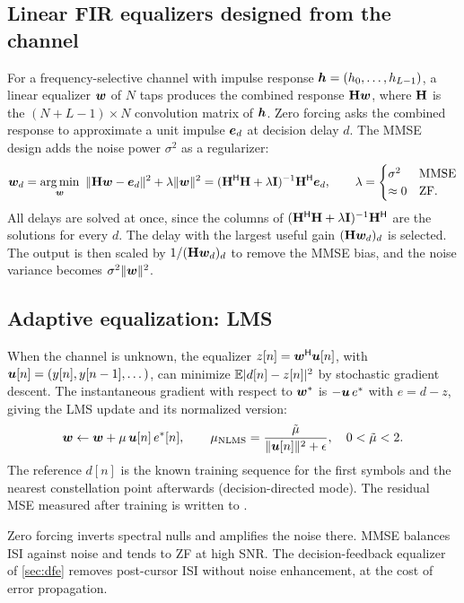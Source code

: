 \subsection{Linear FIR equalizers designed from the channel}
For a frequency-selective channel with impulse response $\bm{h}=(h_0,\dots,h_{L-1})$, a
linear equalizer $\bm{w}$ of $N$ taps produces the combined response $\mathbf{H}\bm{w}$, where
$\mathbf{H}$ is the $(N+L-1)\times N$ convolution matrix of $\bm{h}$. Zero forcing asks the combined
response to approximate a unit impulse $\bm{e}_d$ at decision delay $d$. The MMSE design adds
the noise power $\sigma^2$ as a regularizer:
\begin{equation}
  \bm{w}_d=\operatorname*{arg\,min}_{\bm{w}}\ \|\mathbf{H}\bm{w}-\bm{e}_d\|^2+\lambda\|\bm{w}\|^2
  =(\mathbf{H}^{\mathsf{H}}\mathbf{H}+\lambda\mathbf{I})^{-1}\mathbf{H}^{\mathsf{H}}\bm{e}_d,
  \qquad\lambda=\begin{cases}\sigma^2&\text{MMSE}\\ \approx0&\text{ZF.}\end{cases}
\end{equation}
All delays are solved at once, since the columns of $(\mathbf{H}^{\mathsf{H}}\mathbf{H}+\lambda\mathbf{I})^{-1}\mathbf{H}^{\mathsf{H}}$ are the solutions for every $d$. The delay with the largest useful gain
$(\mathbf{H}\bm{w}_d)_d$ is selected. The output is then scaled by $1/(\mathbf{H}\bm{w}_d)_d$ to remove
the MMSE bias, and the noise variance becomes $\sigma^2\|\bm{w}\|^2$.

\subsection{Adaptive equalization: LMS}
When the channel is unknown, the equalizer $z[n]=\bm{w}^{\mathsf{H}}\bm{u}[n]$, with
$\bm{u}[n]=(y[n],y[n-1],\dots)$, can minimize $\mathbb{E}|d[n]-z[n]|^2$ by stochastic gradient
descent. The instantaneous gradient with respect to $\bm{w}^{*}$ is $-\bm{u}\,e^{*}$ with
$e=d-z$, giving the LMS update and its normalized version:
\begin{equation}
  \bm{w}\leftarrow\bm{w}+\mu\,\bm{u}[n]\,e^{*}[n],\qquad
  \mu_{\mathrm{NLMS}}=\frac{\tilde\mu}{\|\bm{u}[n]\|^2+\epsilon},\quad 0<\tilde\mu<2 .
\end{equation}
The reference $d[n]$ is the known training sequence for the first  symbols and the
nearest constellation point afterwards (decision-directed mode). The residual MSE measured after
training is written to .

\begin{keypoint}
Zero forcing inverts spectral nulls and amplifies the noise there. MMSE balances ISI against
noise and tends to ZF at high SNR. The decision-feedback equalizer of \cref{sec:dfe} removes
post-cursor ISI without noise enhancement, at the cost of error propagation.
\end{keypoint}

